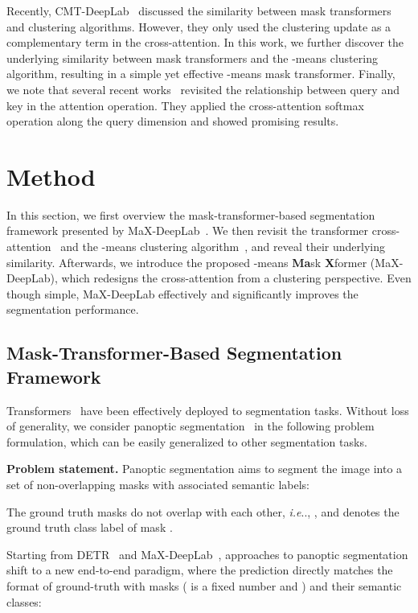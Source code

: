 \documentclass[runningheads]{llncs}
\makeatletter
\DeclareRobustCommand\onedot{\futurelet\@let@token\@onedot}
\def\@onedot{\ifx\@let@token.\else.\null\fi\xspace}
\def\ie{\emph{i.e}\onedot} \def\Ie{\emph{I.e}\onedot}
\makeatother
\begin{document}
Recently, CMT-DeepLab~\cite{yu2022cmt} discussed the similarity between mask transformers and clustering algorithms. However, they only used the clustering update as a complementary term in the cross-attention. In this work, we further discover the underlying similarity between mask transformers and the -means clustering algorithm, resulting in a simple yet effective -means mask transformer.
Finally, we note that several recent works~\cite{locatello2020object,xu2022groupvit,yu2022cmt,zhou2022slot} revisited the relationship between query and key in the attention operation. They applied the cross-attention softmax operation along the query dimension and showed promising results.
%
 \section{Method}
In this section, we first overview the mask-transformer-based segmentation framework presented by MaX-DeepLab~\cite{wang2021max}.
We then revisit the transformer cross-attention~\cite{vaswani2017attention} and the -means clustering algorithm~\cite{lloyd1982least}, and reveal their underlying similarity.
Afterwards, we introduce the proposed -means \textbf{Ma}sk \textbf{X}former (MaX-DeepLab), which redesigns the cross-attention from a clustering perspective. Even though simple, MaX-DeepLab effectively and significantly improves the segmentation performance.


\subsection{Mask-Transformer-Based Segmentation Framework}

Transformers~\cite{vaswani2017attention} have been effectively deployed to segmentation tasks.
Without loss of generality, we consider panoptic segmentation~\cite{kirillov2018panoptic} in the following problem formulation, which can be easily generalized to other segmentation tasks.

\textbf{Problem statement.}\quad
Panoptic segmentation aims to segment the image  into a set of non-overlapping masks with associated semantic labels:

The  ground truth masks  do not overlap with each other, \ie, , and  denotes the ground truth class label of mask .

Starting from DETR~\cite{carion2020end} and MaX-DeepLab~\cite{wang2021max}, approaches to panoptic segmentation shift to a new end-to-end paradigm, where the prediction directly matches the format of ground-truth with  masks ( is a fixed number and ) and their semantic classes:
\end{document}
